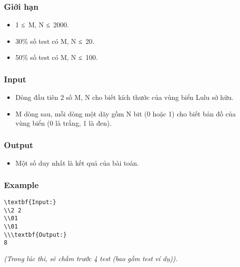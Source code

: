 \subsubsection{   Giới hạn  }
\begin{itemize}
	\item     1 ≤ M, N ≤ 2000.   
	\item     30\% số test có M, N ≤ 20.   
	\item     50\% số test có M, N ≤ 100.   
\end{itemize}
\begin{itemize}
\end{itemize}

\subsubsection{   Input  }
\begin{itemize}
	\item     Dòng đầu tiên 2 số M, N cho biết kích thước của vùng biển Lulu sở hữu.   
	\item     M dòng sau, mỗi dòng một dãy gồm N bit (0 hoặc 1) cho biết bản đồ của vùng biển (0 là trắng, 1 là đen).   
\end{itemize}

\subsubsection{   Output  }
\begin{itemize}
	\item     Một số duy nhất là kết quả của bài toán.   
\end{itemize}
\begin{itemize}
\end{itemize}

\subsubsection{   Example  }
\begin{verbatim}
\textbf{Input:}
\\2 2
\\01
\\01
\\\textbf{Output:}
8\end{verbatim}

\emph{    (Trong lúc thi, sẽ chấm trước 4 test (bao gồm test ví dụ)).   }